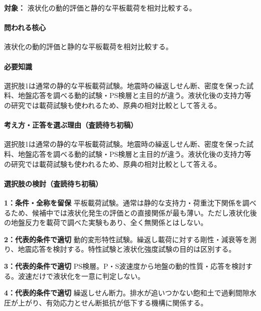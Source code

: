 \noindent\textbf{対象：} 液状化の動的評価と静的な平板載荷を相対比較する。\par

\paragraph{問われる核心} 液状化の動的評価と静的な平板載荷を相対比較する。

\paragraph{必要知識} 選択肢1は通常の静的な平板載荷試験。地震時の繰返しせん断、密度を保った試料、地盤応答を調べる動的試験・PS検層と主目的が違う。液状化後の支持力等の研究では載荷試験も使われるため、原典の相対比較として答える。

\paragraph{考え方・正答を選ぶ理由（査読待ち初稿）} 選択肢1は通常の静的な平板載荷試験。地震時の繰返しせん断、密度を保った試料、地盤応答を調べる動的試験・PS検層と主目的が違う。液状化後の支持力等の研究では載荷試験も使われるため、原典の相対比較として答える。

\paragraph{選択肢の検討（査読待ち初稿）}\mbox{}\par

\noindent\textbf{1：条件・全称を留保} 平板載荷試験。通常は静的な支持力・荷重沈下関係を調べるため、候補中では液状化発生の評価との直接関係が最も薄い。ただし液状化後の地盤反力を載荷で調べた実験もあり、全く無関係とはしない。\par

\noindent\textbf{2：代表的条件で適切} 動的変形特性試験。繰返し載荷に対する剛性・減衰等を測り、地震応答を検討する。特性試験と液状化強度試験の目的は区別する。\par

\noindent\textbf{3：代表的条件で適切} PS検層。P・S波速度から地盤の動的性質・応答を検討する。波速だけで液状化を一意に判定しない。\par

\noindent\textbf{4：代表的条件で適切} 繰返しせん断力。排水が追いつかない飽和土で過剰間隙水圧が上がり、有効応力とせん断抵抗が低下する機構に関係する。\par

